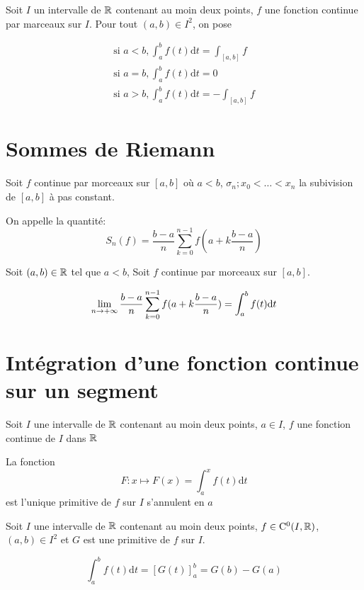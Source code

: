 \begin{dfn}

Soit $I$ un intervalle de $\mathbb{R}$ contenant au moin deux points, $f$ une fonction
continue par marceaux sur $I$.
Pour tout $(a, b) \in I^2$, on pose

\begin{gather*}
    \text{si } a < b, \int_a^b f(t)\mathrm{d}t = \int_{[a, b]} f \\
    \text{si } a = b, \int_a^b f(t)\mathrm{d}t = 0 \\
    \text{si } a > b, \int_a^b f(t)\mathrm{d}t = - \int_{[a, b]} f
\end{gather*}
\end{dfn}

\section{Sommes de Riemann}

\begin{dfn}
Soit $f$ continue par morceaux sur $[a, b]$ où $a < b$,
$\sigma_n ; x_0 < \ldots < x_n$ la subivision de $[a, b]$
à pas constant.

On appelle 
la quantité:
\[
    S_n(f) = \frac{b - a}{n} \sum_{k = 0}^{n - 1} f(a + k\frac{b - a}{n})
\]
\end{dfn}

\begin{prp}
Soit $(a, b) \in \mathbb{R}$ tel que $a < b$, Soit $f$ continue par morceaux sur
$[a, b]$.

\[
    \lim\limits_{n \to +\infty} \frac{b - a}{n} \sum_{k = 0}^{n - 1} f(a + k \frac{b - a}{n}) =
    \int_a^b f(t)\mathrm{d}t
\]
\end{prp}

\section{Intégration d'une fonction continue sur un segment}

\begin{thm}
Soit $I$ une intervalle de $\mathbb{R}$ contenant au moin deux points, $a \in I$,
$f$ une fonction continue de $I$ dans $\mathbb{R}$

La fonction
\[
    F : x \mapsto F(x) = \int_a^x f(t)\mathrm{d}t
\]
est l'unique primitive de $f$ sur $I$ s'annulent en $a$
\end{thm}

\begin{prp}
Soit $I$ une intervalle de $\mathbb{R}$ contenant au moin deux points,
$f \in \mathrm{C^{0}}(I, \mathbb{R})$, $(a, b) \in I^2$ et $G$ est une primitive
de $f$ sur $I$.

\[
    \int^b_a f(t)\mathrm{d}t = \left[G(t)\right]^b_a = G(b) - G(a)
\]
\end{prp}

